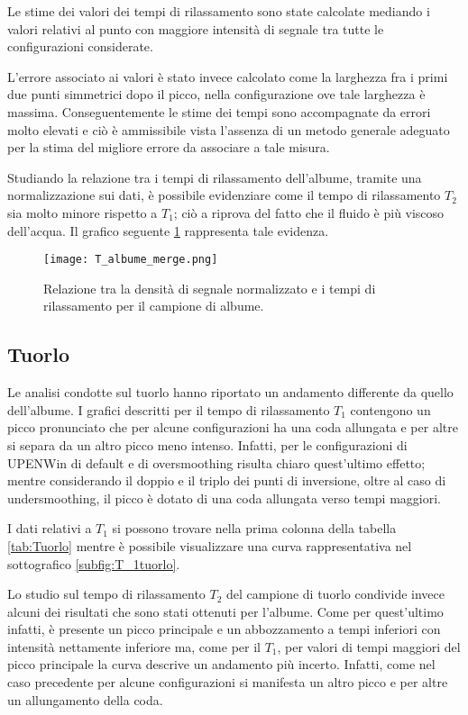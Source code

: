 Le stime dei valori dei tempi di rilassamento sono state calcolate mediando i valori relativi al punto con maggiore intensità di segnale tra tutte le configurazioni considerate.

L'errore associato ai valori è stato invece calcolato come la larghezza fra i primi due punti simmetrici dopo il picco, nella configurazione ove tale larghezza è massima.
Conseguentemente le stime dei tempi sono accompagnate da errori molto elevati e ciò è ammissibile vista l'assenza di un metodo generale adeguato per la stima del migliore errore da associare a tale misura.

Studiando la relazione tra i tempi di rilassamento dell'albume, tramite una normalizzazione sui dati, è possibile evidenziare come il tempo di rilassamento $T_2$ sia molto minore rispetto a $T_1$;
ciò a riprova del fatto che il fluido è più viscoso dell'acqua.   
Il grafico seguente \ref{fig:Albume} rappresenta tale evidenza.

\begin{figure}[h!]
\centering
\texttt{[image: T\_albume\_merge.png]}
\caption{Relazione tra la densità di segnale normalizzato e i tempi di rilassamento per il campione di albume.}
\label{fig:Albume}
\end{figure}

\newpage
\subsection*{Tuorlo}

Le analisi condotte sul tuorlo hanno riportato un andamento differente da quello dell'albume.
I grafici descritti per il tempo di rilassamento $T_1$ contengono un picco pronunciato che per alcune configurazioni ha una coda allungata e per altre si separa da un altro picco meno intenso.
Infatti, per le configurazioni di UPENWin di default e di oversmoothing risulta chiaro quest'ultimo effetto; mentre considerando il doppio e il triplo dei punti di inversione, oltre al caso di undersmoothing, il picco è dotato di una coda allungata verso tempi maggiori.

I dati relativi a $T_1$ si possono trovare nella prima colonna della tabella \ref{tab:Tuorlo} mentre è possibile visualizzare una curva rappresentativa nel sottografico \ref{subfig:T_1tuorlo}. 

Lo studio sul tempo di rilassamento $T_2$ del campione di tuorlo condivide invece alcuni dei risultati che sono stati ottenuti per l'albume. 
Come per quest'ultimo infatti, è presente un picco principale e un abbozzamento a tempi inferiori con intensità nettamente inferiore ma, come per il $T_1$, per valori di tempi maggiori del picco principale la curva descrive un andamento più incerto.
Infatti, come nel caso precedente per alcune configurazioni si manifesta un altro picco e per altre un allungamento della coda.


